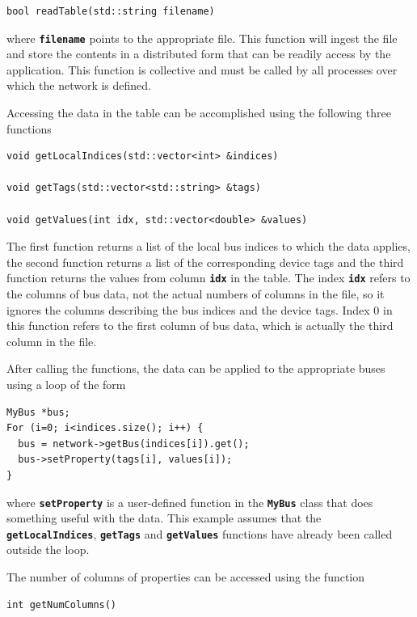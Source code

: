 {
\color{red}
\begin{Verbatim}[fontseries=b]
bool readTable(std::string filename)
\end{Verbatim}
}

where \texttt{\textbf{filename}} points to the appropriate file. This function will ingest the file and store the contents in a distributed form that can be readily access by the application. This function is collective and must be called by all processes over which the network is defined.

Accessing the data in the table can be accomplished using the following three functions

{
\color{red}
\begin{Verbatim}[fontseries=b]
void getLocalIndices(std::vector<int> &indices)

void getTags(std::vector<std::string> &tags)

void getValues(int idx, std::vector<double> &values)
\end{Verbatim}
}

The first function returns a list of the local bus indices to which the data applies, the second function returns a list of the corresponding device tags and the third function returns the values from column \texttt{\textbf{idx}} in the table.
The index \texttt{\textbf{idx}} refers to the columns of bus data, not the
actual numbers of columns in the file, so it ignores the columns describing the
bus indices and the device tags. Index 0 in this function refers to the first
column of bus data, which is actually the third column in the file.

After calling the functions, the data can be applied to the appropriate buses using a loop of the form

{
\color{red}
\begin{Verbatim}[fontseries=b]
MyBus *bus;
For (i=0; i<indices.size(); i++) {
  bus = network->getBus(indices[i]).get();
  bus->setProperty(tags[i], values[i]);
}
\end{Verbatim}
}

where \texttt{\textbf{setProperty}} is a user-defined function in the
\texttt{\textbf{MyBus}} class that does something useful with the data. This
example assumes that the \texttt{\textbf{getLocalIndices}},
\texttt{\textbf{getTags}} and \texttt{\textbf{getValues}} functions have already been called outside the loop.

The number of columns of properties can be accessed using the function

{
\color{red}
\begin{Verbatim}[fontseries=b]
int getNumColumns()
\end{Verbatim}
}
\hyperlink{topDoc}{\color{blue}{Top}}
